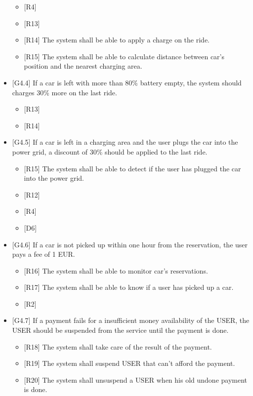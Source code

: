 \begin{itemize}
\begin{itemize}
\item {[}R4{]}
\item {[}R13{]}
\item {[}R14{]} The system shall be able to apply a charge on the ride.
\item {[}R15{]} The system shall be able to calculate distance between car's
position and the nearest charging area.
\end{itemize}
\item {[}G4.4{]} If a car is left with more than 80\% battery empty, the
system should charges 30\% more on the last ride. 
\begin{itemize}
\item {[}R13{]}
\item {[}R14{]}
\end{itemize}
\item {[}G4.5{]} If a car is left in a charging area and the user plugs
the car into the power grid, a discount of 30\% should be applied
to the last ride.
\begin{itemize}
\item {[}R15{]} The system shall be able to detect if the user has plugged
the car into the power grid.
\item {[}R12{]}
\item {[}R4{]}
\item {[}D6{]}
\end{itemize}
\item {[}G4.6{]} If a car is not picked up within one hour from the reservation,
the user pays a fee of 1 EUR.
\begin{itemize}
\item {[}R16{]} The system shall be able to monitor car's reservations.
\item {[}R17{]} The system shall be able to know if a user has picked up
a car. 
\item {[}R2{]}
\end{itemize}
\item {[}G4.7{]} If a payment fails for a insufficient money availability
of the USER, the USER should be suspended from the service until the
payment is done.
\begin{itemize}
\item {[}R18{]} The system shall take care of the result of the payment.
\item {[}R19{]} The system shall suspend USER that can't afford the payment.
\item {[}R20{]} The system shall unsuspend a USER when his old undone payment
is done.
\end{itemize}

\end{itemize}
